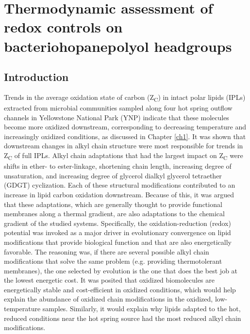 \chapter{Thermodynamic assessment of redox controls on bacteriohopanepolyol headgroups}\label{ch3}


\section{Introduction}

Trends in the average oxidation state of carbon (Z\textsubscript{C}) in intact polar lipids (IPLs) extracted from microbial communities sampled along four hot spring outflow channels in Yellowstone National Park (YNP) indicate that these molecules become more oxidized downstream, corresponding to decreasing temperature and increasingly oxidized conditions, as discussed in Chapter \ref{ch1}. It was shown that downstream changes in alkyl chain structure were most responsible for trends in Z\textsubscript{C} of full IPLs. Alkyl chain adaptations that had the largest impact on Z\textsubscript{C} were shifts in ether- to ester-linkage, shortening chain length, increasing degree of unsaturation, and increasing degree of glycerol dialkyl glycerol tetraether (GDGT) cyclization. Each of these structural modifications contributed to an increase in lipid carbon oxidation downstream. Because of this, it was argued that these adaptations, which are generally thought to provide functional membranes along a thermal gradient, are also adaptations to the chemical gradient of the studied systems. Specifically, the oxidation-reduction (redox) potential was invoked as a major driver in evolutionary convergence on lipid modifications that provide biological function and that are also energetically favorable. The reasoning was, if there are several possible alkyl chain modifications that solve the same problem (e.g. providing thermotolerant membranes), the one selected by evolution is the one that does the best job at the lowest energetic cost. It was posited that oxidized biomolecules are energetically stable and cost-efficient in oxidized conditions, which would help explain the abundance of oxidized chain modifications in the oxidized, low-temperature samples. Similarly, it would explain why lipids adapted to the hot, reduced conditions near the hot spring source had the most reduced alkyl chain modifications.


